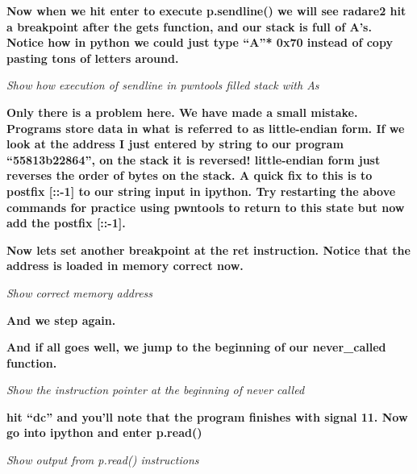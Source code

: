\documentclass[letterpaper]{article}
\newcommand{\sitfig}[3]{
\begin{figure}[H]
\centering
\makebox[\textwidth][c]{
#2
}
\label{#1}
\end{figure}
}
\newcommand{\sitgfx}[4][scale=1.0]{
\sitfig{#3}{\texttt{[image: \#2]}}{#4}
}
\begin{document}
\textbf{Now when we hit enter to execute p.sendline() we will see radare2 hit a breakpoint after the gets function, and
our stack is full of A's. Notice how in python we could just type ``A''* 0x70 instead of copy pasting tons of letters
around.}

  
\sitgfx[width=5.8335in,height=3.6457in]{FINALWORKINGDOCFORMERLYPRECURSOR-img104.png}{fig:unk}{TODO CAPTION}
 

\textit{Show how execution of sendline in pwntools filled stack with As}

\textbf{Only there is a problem here. We have made a small mistake. Programs store data in what is referred to as
little-endian form. If we look at the address I just entered by string to our program ``55813b22864'', on the stack it
is reversed! little-endian form just reverses the order of bytes on the stack. A quick fix to this is to postfix [::-1]
to our string input in ipython. Try restarting the above commands for practice using pwntools to return to this state
but now add the postfix [::-1].}

  
\sitgfx[width=5.8335in,height=3.6457in]{FINALWORKINGDOCFORMERLYPRECURSOR-img105.png}{fig:unk}{TODO CAPTION}
 

\textbf{Now lets set another breakpoint at the ret instruction. Notice that the address is loaded in memory correct
now.}

  
\sitgfx[width=5.8335in,height=1.922in]{FINALWORKINGDOCFORMERLYPRECURSOR-img106.png}{fig:unk}{TODO CAPTION}
 

\textit{Show correct memory address}

\textbf{And we step again.}

  
\sitgfx[width=5.8335in,height=3.6457in]{FINALWORKINGDOCFORMERLYPRECURSOR-img107.png}{fig:unk}{TODO CAPTION}
 

\textbf{And if all goes well, we jump to the beginning of our never\_called function.}

  
\sitgfx[width=5.8335in,height=3.6457in]{FINALWORKINGDOCFORMERLYPRECURSOR-img096.png}{fig:unk}{TODO CAPTION}
 

\textit{Show the instruction pointer at the beginning of never called}

\textbf{hit ``dc'' and you'll note that the program finishes with signal 11. Now go into ipython and enter p.read()}

  
\sitgfx[width=5.8335in,height=3.6457in]{FINALWORKINGDOCFORMERLYPRECURSOR-img108.png}{fig:unk}{TODO CAPTION}
 

\textit{Show output from p.read() instructions}
\end{document}
